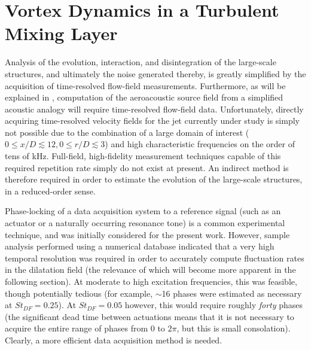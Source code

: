 \section{Vortex Dynamics in a Turbulent Mixing Layer}
\label{sect:velocity}
Analysis of the evolution, interaction, and disintegration of the large-scale structures, and ultimately the noise generated thereby, is greatly simplified by the acquisition of time-resolved flow-field measurements.
Furthermore, as will be explained in , computation of the aeroacoustic source field from a simplified acoustic analogy will require time-resolved flow-field data.
Unfortunately, directly acquiring time-resolved velocity fields for the jet currently under study is simply not possible due to the combination of a large domain of interest ($0 \leq x/D \lesssim 12, 0 \leq r/D \lesssim 3$) and high characteristic frequencies on the order of tens of kHz.
Full-field, high-fidelity measurement techniques capable of this required repetition rate simply do not exist at present.
An indirect method is therefore required in order to estimate the evolution of the large-scale structures, in a reduced-order sense.

Phase-locking of a data acquisition system to a reference signal (such as an actuator or a naturally occurring resonance tone) is a common experimental technique, and was initially considered for the present work.
However, sample analysis performed using a numerical database indicated that a very high temporal resolution was required in order to accurately compute fluctuation rates in the dilatation field (the relevance of which will become more apparent in the following section).
At moderate to high excitation frequencies, this was feasible, though potentially tedious (for example, $\sim$16 phases were estimated as necessary at $St_{DF} =0.25$).
At $St_{DF} =0.05$ however, this would require roughly \textit{forty} phases (the significant dead time between actuations means that it is not necessary to acquire the entire range of phases from $0$ to $2\pi$, but this is small consolation).
Clearly, a more efficient data acquisition method is needed.

